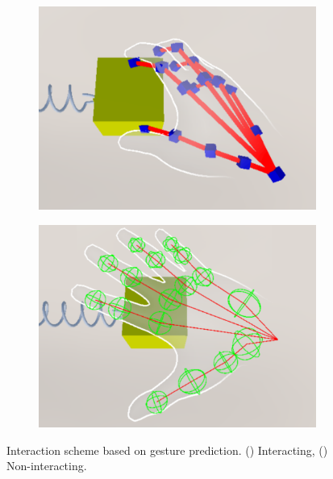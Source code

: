 \begin{figure}
  \begin{subfigure}{0.48\linewidth} %
    \centering
    \includegraphics[width=\linewidth]{image/interacting-scheme.pdf}
    \caption{} %
    \label{fig:interacting-scheme}
  \end{subfigure}
  \hfill %
  \begin{subfigure}{0.48\linewidth} %
    \centering
    \includegraphics[width=\linewidth]{image/non-interacting-scheme.pdf}
    \caption{} %
    \label{fig:non-interacting-scheme}
  \end{subfigure}
  \caption{Interaction scheme based on gesture prediction. () Interacting, () Non-interacting.}
  \label{fig:interaction-scheme}
\end{figure}